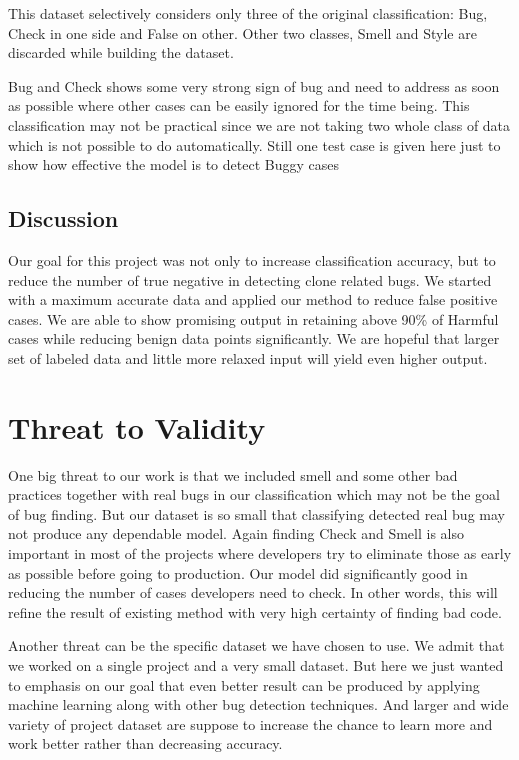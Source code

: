 \documentclass[nocopyrightspace]{sigplanconf}
\begin{document}
\noindent
This dataset selectively considers only three of the original classification: Bug, Check in one side and False on other. Other two classes, Smell and Style are discarded while building the dataset.

\noindent
Bug and Check shows some very strong sign of bug and need to address as soon as possible where other cases can be easily ignored for the time being. This classification may not be practical since we are not taking two whole class of data which is not possible to do automatically. Still one test case is given here just to show how effective the model is to detect Buggy cases

\subsection{Discussion}
Our goal for this project was not only to increase classification accuracy, but to reduce the number of true negative in detecting clone related bugs. We started with a maximum accurate data and applied our method to reduce false positive cases. We are able to show promising output in retaining above 90\% of Harmful cases while reducing benign data points significantly. We are hopeful that larger set of labeled data and little more relaxed input will yield even higher output.

\section{Threat to Validity}
One big threat to our work is that we included smell and some other bad practices together with real bugs in our classification which may not be the goal of bug finding. But our dataset is so small that classifying detected real bug may not produce any dependable model. Again finding Check and Smell is also important in most of the projects where developers try to eliminate those as early as possible before going to production. Our model did significantly good in reducing the number of cases developers need to check. In other words, this will refine the result of existing method with very high certainty of finding bad code.

\vspace{10pt}
\noindent
Another threat can be the specific dataset we have chosen to use. We admit that we worked on a single project and a very small dataset. But here we just wanted to emphasis on our goal that even better result can be produced by applying machine learning along with other bug detection techniques. And larger and wide variety of project dataset are suppose to increase the chance to learn more and work better rather than decreasing accuracy.
\end{document}
